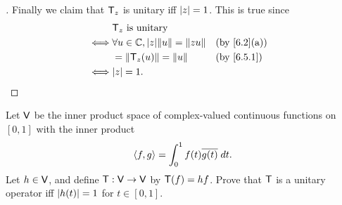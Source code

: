\begin{proof}[]
  Finally we claim that \(\mathsf{T}_z\) is unitary iff \(\left\lvert z\right\rvert = 1\).
  This is true since
  \begin{align*}
         & \T_z \text{ is unitary}                                         \\
    \iff & \forall u \in \C, \abs{z} \norm{u} = \norm{zu} &  & \by{6.2}[a] \\
         & = \norm{\T_z(u)} = \norm{u}                    &  & \by{6.5.1}  \\
    \iff & \abs{z} = 1.
  \end{align*}
\end{proof}

\setcounter{ex}{5}
\begin{ex}\label{ex:6.5.6}
  Let \(\mathsf{V}\) be the inner product space of complex-valued continuous functions on \([0, 1]\) with the inner product
  \[
    \left\langle f, g\right\rangle = \int_0^1 f(t) \overline{g(t)} \; dt.
  \]
  Let \(h \in \mathsf{V}\), and define \(\mathsf{T} : \mathsf{V} \to \mathsf{V}\) by \(\mathsf{T}(f) = hf\).
  Prove that \(\mathsf{T}\) is a unitary operator iff \(\left\lvert h(t)\right\rvert = 1\) for \(t \in [0, 1]\).
\end{ex}

